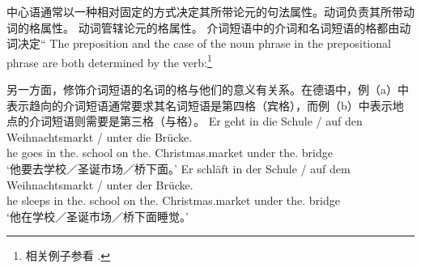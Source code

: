 \noindent
中心语通常以一种相对固定的方式决定其所带论元的句法属性。动词负责其所带动词的格属性。
\eal
{}
\zl
动词管辖论元的格属性。
 介词短语中的介词和名词短语的格都由动词决定“
The preposition and the case of the noun phrase in the prepositional phrase are both determined by the verb:\footnote{相关例子参看 .
}

\eal
{}
\zl
\largerpage%
另一方面，修饰介词短语的名词的格与他们的意义有关系。在德语中，例（a）中表示趋向的介词短语通常要求其名词短语是第四格（宾格），而例（b）中表示地点的介词短语则需要是第三格（与格）。
\eal
\ex
\gll Er geht in die Schule / auf den Weihnachtsmarkt / unter die Brücke.\\
	 he goes in the.\acc{} school {} on the.\acc{} Christmas.market {} under the.\acc{} bridge\\
\glt `他要去学校／圣诞市场／桥下面。'
\ex 
\gll Er schläft in der Schule / auf dem Weihnachtsmarkt / unter der Brücke.\\
	 he sleeps in the.\dat{} school {} on the.\dat{} Christmas.market {} under the.\dat{} bridge\\
\glt `他在学校／圣诞市场／桥下面睡觉。'
\zl

